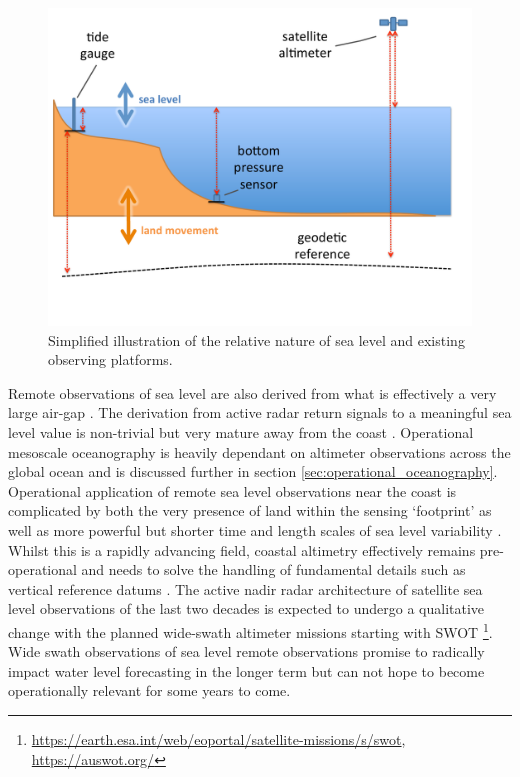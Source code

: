 \begin{figure}[H]\centering
  \includegraphics[width=\figwidthBig]{figures/diagrams/sealevel_cartoon.pdf}
  \caption{Simplified illustration of the relative nature of sea level and existing observing platforms.}
  \label{fig:sealevelObsCartoon}
\end{figure}
Remote observations of sea level are also derived from what is effectively a very large air-gap .   The derivation from active radar return signals to a meaningful sea level value is non-trivial but very mature away from the coast \citep{Fu:2001ub}.  Operational mesoscale oceanography is heavily dependant on altimeter observations across the global ocean and is discussed further in section \ref{sec:operational_oceanography}.  
Operational application of remote sea level observations near the coast is complicated by both the very presence of land within the sensing `footprint' as well as more powerful but shorter time and length scales of sea level variability \citep{Vignudelli:2011wl}.   Whilst this is a  rapidly advancing field, coastal altimetry effectively remains pre-operational and needs to solve the handling of fundamental details such as vertical reference datums \citep{10.3389/fmars.2020.549467}.
The active nadir radar architecture of satellite sea level observations of the last two decades is expected to undergo a qualitative change with the planned wide-swath altimeter missions starting with SWOT \footnote{\url{https://earth.esa.int/web/eoportal/satellite-missions/s/swot}, \url{https://auswot.org/}}.   Wide swath observations of sea level remote observations promise to radically impact water level forecasting in the longer term but can not hope to become operationally relevant for some years to come. 

